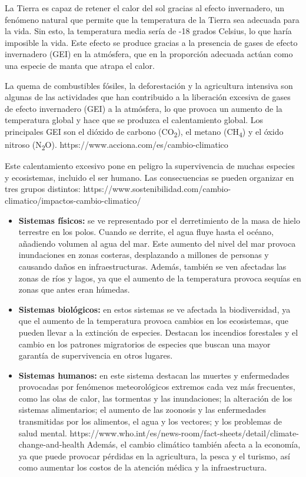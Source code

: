 \documentclass[12pt,a4paper]{report}
\begin{document}
La Tierra es capaz de retener el calor del sol gracias al efecto invernadero, un fenómeno natural que permite que la temperatura de la Tierra sea adecuada para la vida. Sin esto, la temperatura media sería de 
-18 grados Celsius, lo que haría imposible la vida. Este efecto se produce gracias a la presencia de gases de efecto invernadero (GEI) en la atmósfera, que en la proporción adecuada actúan como una especie de 
manta que atrapa el calor.

La quema de combustibles fósiles, la deforestación y la agricultura intensiva son algunas de las actividades que han contribuido a la liberación excesiva de gases de efecto invernadero (GEI) a la atmósfera, lo 
que provoca un aumento de la temperatura global y hace que se produzca el calentamiento global. Los principales GEI son el dióxido de carbono (CO\textsubscript{2}), el metano (CH\textsubscript{4}) y el óxido 
nitroso (N\textsubscript{2}O). {https://www.acciona.com/es/cambio-climatico}

Este calentamiento excesivo pone en peligro la supervivencia de muchas especies y ecosistemas, incluido el ser humano. Las consecuencias se pueden organizar en tres grupos distintos: {https://www.sostenibilidad.com/cambio-climatico/impactos-cambio-climatico/}

\begin{itemize}
    \item \textbf{Sistemas físicos:} se ve representado por el derretimiento de la masa de hielo terrestre en los polos. Cuando se derrite, el agua fluye hasta el océano, añadiendo volumen al agua del mar. Este 
    aumento del nivel del mar provoca inundaciones en zonas costeras, desplazando a millones de personas y causando daños en infraestructuras. Además, también se ven afectadas las zonas de ríos y lagos, ya que 
    el aumento de la temperatura provoca sequías en zonas que antes eran húmedas.
    
    \item \textbf{Sistemas biológicos:} en estos sistemas se ve afectada la biodiversidad, ya que el aumento de la temperatura provoca cambios en los ecosistemas, que pueden llevar a la extinción de especies. 
    Destacan los incendios forestales y el cambio en los patrones migratorios de especies que buscan una mayor garantía de supervivencia en otros lugares.
    
    \item \textbf{Sistemas humanos:} en este sistema destacan las muertes y enfermedades provocadas por fenómenos meteorológicos extremos cada vez más frecuentes, como las olas de calor, las tormentas y las 
    inundaciones; la alteración de los sistemas alimentarios; el aumento de las zoonosis y las enfermedades transmitidas por los alimentos, el agua y los vectores; y los problemas de salud mental. {https://www.who.int/es/news-room/fact-sheets/detail/climate-change-and-health} Además, el cambio climático también afecta a la economía, ya que puede provocar pérdidas en la agricultura, la pesca y el turismo, así como aumentar los costos de la atención médica y la infraestructura.
\end{itemize}
\end{document}
